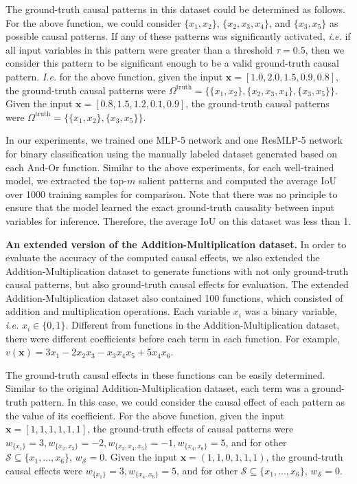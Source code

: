 The ground-truth causal patterns in this dataset could be determined as follows.
For the above function, we could consider {\small$\{x_1,x_2\}$}, {\small$\{x_2,x_3,x_4\}$}, and {\small$\{x_3, x_5\}$} as possible causal patterns.
If any of these patterns was significantly activated, \emph{i.e.} if all input variables in this pattern were greater than a threshold {\small$\tau=0.5$}, then we consider this pattern to be significant enough to be a valid  ground-truth causal pattern.
\emph{I.e.} for the above function, given the input {\small$\boldsymbol{x}=[1.0, 2.0, 1.5, 0.9, 0.8]$}, the ground-truth causal patterns were {\small$\Omega^{\text{truth}}=\{\{x_1,x_2\},\{x_2,x_3,x_4\},\{x_3, x_5\}\}$}.
Given the input {\small$\boldsymbol{x}=[0.8, 1.5, 1.2, 0.1, 0.9]$}, the ground-truth causal patterns were {\small$\Omega^{\text{truth}}=\{\{x_1,x_2\},\{x_3, x_5\}\}$}.


In our experiments, we trained one MLP-5 network and one ResMLP-5 network for binary classification using the manually labeled dataset generated based on each And-Or function.
Similar to the above experiments, for each well-trained model, we extracted the top-{\small$m$} salient patterns and computed the average IoU over 1000 training samples for comparison.
Note that there was no principle to ensure that the model learned the exact ground-truth causality between input variables for inference.
Therefore, the average IoU on this dataset was less than 1.




\textbf{An extended version of the Addition-Multiplication dataset.}
In order to evaluate the accuracy of the computed causal effects, 
we also extended the Addition-Multiplication dataset to generate functions with not only ground-truth causal patterns, but also ground-truth causal effects for evaluation.
The extended Addition-Multiplication dataset also contained 100 functions, which consisted of addition and multiplication operations.
Each variable {\small$x_i$} was a binary variable, \emph{i.e.} {\small$x_i\in\{0,1\}$}.
Different from functions in the Addition-Multiplication dataset, there were different coefficients before each term in each function.
For example, {\small$v(\boldsymbol{x})=3x_1-2x_2x_3-x_3x_4x_5+5x_4x_6$}.


The ground-truth causal effects in these functions can be easily determined.
Similar to the original Addition-Multiplication dataset, each term was a ground-truth pattern.
In this case, we could consider the causal effect of each pattern as the value of its coefficient.
For the above function, given the input {\small$\boldsymbol{x}=[1,1,1,1,1,1]$}, the ground-truth effects of causal patterns were {\small$w_{\{x_1\}}=3, w_{\{x_2,x_3\}}=-2, w_{\{x_3,x_4,x_5\}}=-1, w_{\{x_4, x_6\}}=5$}, and for other {\small$\mathcal{S}\subseteq\{x_1,...,x_6\}$}, {\small$w_{\mathcal{S}}=0$}.
Given the input {\small$\boldsymbol{x}=(1,1,0,1,1,1)$}, the ground-truth causal effects were {\small$w_{\{x_1\}}=3, w_{\{x_4, x_6\}}=5$}, and for other {\small$\mathcal{S}\subseteq\{x_1,...,x_6\}$}, {\small$w_{\mathcal{S}}=0$}.


